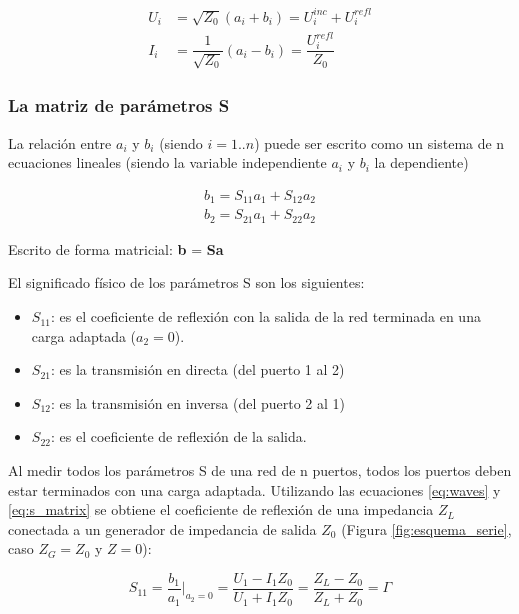 \begin{equation}
\begin{aligned}
	U_i &= \sqrt{Z_0}(a_i + b_i) = U_i^{inc} + U_i^{refl}\\
	I_i &= \dfrac{1}{\sqrt{Z_0}}(a_i - b_i) = \dfrac{U_i^{refl}}{Z_0}
\end{aligned}
\end{equation}


\subsubsection{La matriz de parámetros S}

La relación entre $a_i$ y $b_i$ (siendo $i=1..n$) puede ser escrito como un sistema de n ecuaciones lineales (siendo la variable
independiente $a_i$ y $b_i$ la dependiente)

\begin{equation}
\begin{aligned}
	b_1 = S_{11}a_1 + S_{12}a_2 \\
	b_2 = S_{21}a_1 + S_{22}a_2
\end{aligned}
\label{eq:s_matrix}
\end{equation}

Escrito de forma matricial: \textbf{b} = \textbf{Sa}

El significado físico de los parámetros S son los siguientes:
\begin{itemize}
	\item $S_{11}$: es el coeficiente de reflexión con la salida de la red terminada en una carga adaptada ($a_2 = 0$).
	\item $S_{21}$: es la transmisión en directa (del puerto 1 al 2)
	\item $S_{12}$: es la transmisión en inversa (del puerto 2 al 1)
	\item $S_{22}$: es el coeficiente de reflexión de la salida.
\end{itemize}

Al medir todos los parámetros S de una red de n puertos, todos los puertos deben estar terminados con una carga adaptada.
Utilizando las ecuaciones \ref{eq:waves} y \ref{eq:s_matrix} se obtiene el coeficiente de reflexión de una impedancia $Z_L$
conectada a un generador de impedancia de salida $Z_0$ (Figura \ref{fig:esquema_serie}, caso $Z_G = Z_0$ y $Z = 0$):

\begin{equation}
S_{11} = \dfrac{b_1}{a_1}\bigg|_{a_2=0} = \dfrac{U_1 - I_1Z_0}{U_1 + I_1Z_0} = \dfrac{Z_L - Z_0}{Z_L + Z_0} = \Gamma
\end{equation}


